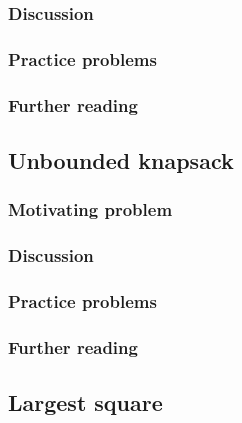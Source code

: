 
\subsubsection*{Discussion}

\subsubsection*{Practice problems}

\subsubsection*{Further reading}

\subsection{Unbounded knapsack}

\subsubsection*{Motivating problem}







\subsubsection*{Discussion}

\subsubsection*{Practice problems}

\subsubsection*{Further reading}

\subsection{Largest square}

